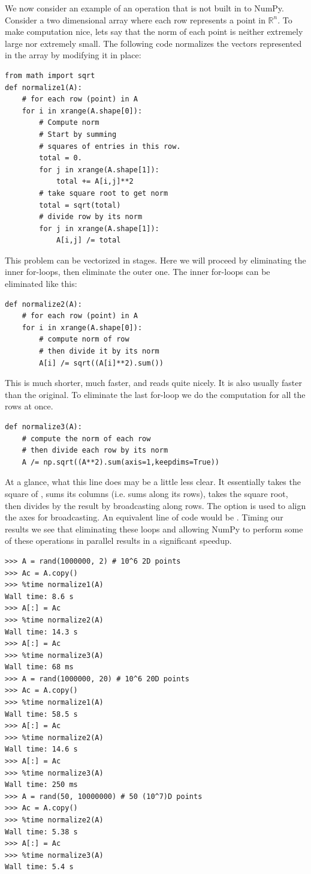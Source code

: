 We now consider an example of an operation that is not built in to NumPy.
Consider a two dimensional array where each row represents a point in $\mathbb{R}^n$.
To make computation nice, lets say that the norm of each point is neither extremely large nor extremely small.
The following code normalizes the vectors represented in the array by modifying it in place:
\begin{lstlisting}
from math import sqrt
def normalize1(A):
    # for each row (point) in A
    for i in xrange(A.shape[0]):
        # Compute norm
        # Start by summing
        # squares of entries in this row.
        total = 0.
        for j in xrange(A.shape[1]):
            total += A[i,j]**2
        # take square root to get norm
        total = sqrt(total)
        # divide row by its norm
        for j in xrange(A.shape[1]):
            A[i,j] /= total
\end{lstlisting}
This problem can be vectorized in stages.
Here we will proceed by eliminating the inner for-loops, then eliminate the outer one.
The inner for-loops can be eliminated like this:
\begin{lstlisting}
def normalize2(A):
    # for each row (point) in A
    for i in xrange(A.shape[0]):
        # compute norm of row
        # then divide it by its norm
        A[i] /= sqrt((A[i]**2).sum())
\end{lstlisting}
This is much shorter, much faster, and reads quite nicely.
It is also usually faster than the original.
To eliminate the last for-loop we do the computation for all the rows at once.
\begin{lstlisting}
def normalize3(A):
    # compute the norm of each row
    # then divide each row by its norm
    A /= np.sqrt((A**2).sum(axis=1,keepdims=True))
\end{lstlisting}
At a glance, what this line does may be a little less clear.
It essentially takes the square of , sums its columns (i.e. sums along its rows), takes the square root, then divides  by the result by broadcasting along rows.
The  option is used to align the axes for broadcasting.
An equivalent line of code would be .
Timing our results we see that eliminating these loops and allowing NumPy to perform some of these operations in parallel results in a significant speedup.
\begin{lstlisting}
>>> A = rand(1000000, 2) # 10^6 2D points
>>> Ac = A.copy()
>>> %time normalize1(A)
Wall time: 8.6 s
>>> A[:] = Ac
>>> %time normalize2(A)
Wall time: 14.3 s
>>> A[:] = Ac
>>> %time normalize3(A)
Wall time: 68 ms
>>> A = rand(1000000, 20) # 10^6 20D points
>>> Ac = A.copy()
>>> %time normalize1(A)
Wall time: 58.5 s
>>> A[:] = Ac
>>> %time normalize2(A)
Wall time: 14.6 s
>>> A[:] = Ac
>>> %time normalize3(A)
Wall time: 250 ms
>>> A = rand(50, 10000000) # 50 (10^7)D points
>>> Ac = A.copy()
>>> %time normalize2(A)
Wall time: 5.38 s
>>> A[:] = Ac
>>> %time normalize3(A)
Wall time: 5.4 s
\end{lstlisting}
